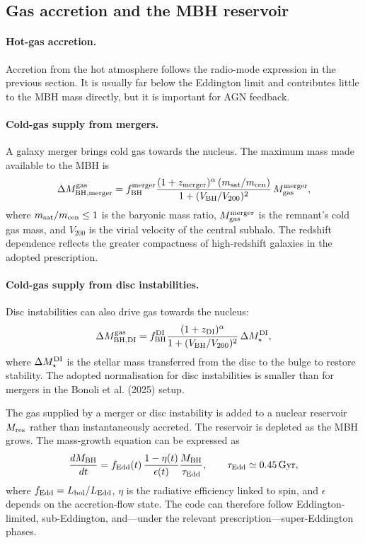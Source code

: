 \documentclass[11pt,a4paper]{article}
\begin{document}
\subsection{Gas accretion and the MBH reservoir}

\paragraph{Hot-gas accretion.} Accretion from the hot atmosphere follows the radio-mode expression in the previous section. It is usually far below the Eddington limit and contributes little to the MBH mass directly, but it is important for AGN feedback.

\paragraph{Cold-gas supply from mergers.} A galaxy merger brings cold gas towards the nucleus. The maximum mass made available to the MBH is
\begin{equation}
 \Delta M_{\rm BH,merger}^{\rm gas}=
 f_{\rm BH}^{\rm merger}
 \frac{(1+z_{\rm merger})^{\alpha}\,(m_{\rm sat}/m_{\rm cen})}
 {1+(V_{\rm BH}/V_{200})^2}\,M_{\rm gas}^{\rm merger},
 \label{eq:bhmerger}
\end{equation}
where $m_{\rm sat}/m_{\rm cen}\leq 1$ is the baryonic mass ratio, $M_{\rm gas}^{\rm merger}$ is the remnant's cold gas mass, and $V_{200}$ is the virial velocity of the central subhalo. The redshift dependence reflects the greater compactness of high-redshift galaxies in the adopted prescription.

\paragraph{Cold-gas supply from disc instabilities.} Disc instabilities can also drive gas towards the nucleus:
\begin{equation}
 \Delta M_{\rm BH,DI}^{\rm gas}=
 f_{\rm BH}^{\rm DI}
 \frac{(1+z_{\rm DI})^{\alpha}}
 {1+(V_{\rm BH}/V_{200})^2}\,\Delta M_{\star}^{\rm DI},
\end{equation}
where $\Delta M_{\star}^{\rm DI}$ is the stellar mass transferred from the disc to the bulge to restore stability. The adopted normalisation for disc instabilities is smaller than for mergers in the Bonoli et al. (2025) setup.

The gas supplied by a merger or disc instability is added to a nuclear reservoir $M_{\rm res}$ rather than instantaneously accreted. The reservoir is depleted as the MBH grows. The mass-growth equation can be expressed as
\begin{equation}
 \frac{dM_{\rm BH}}{dt}=
 f_{\rm Edd}(t)\,\frac{1-\eta(t)}{\epsilon(t)}
 \frac{M_{\rm BH}}{\tau_{\rm Edd}},
 \qquad \tau_{\rm Edd}\simeq0.45\,\mathrm{Gyr},
\end{equation}
where $f_{\rm Edd}=L_{\rm bol}/L_{\rm Edd}$, $\eta$ is the radiative efficiency linked to spin, and $\epsilon$ depends on the accretion-flow state. The code can therefore follow Eddington-limited, sub-Eddington, and—under the relevant prescription—super-Eddington phases.
\end{document}
